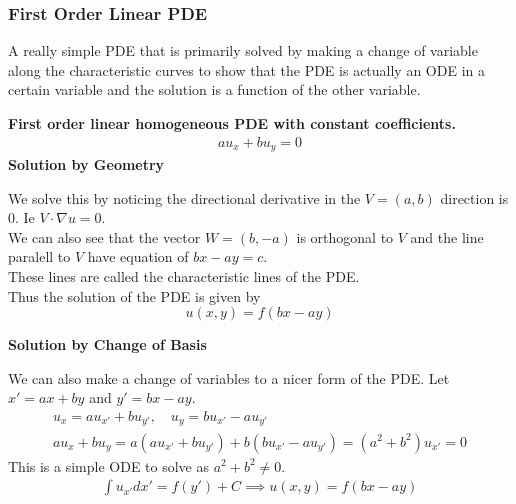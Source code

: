 \documentclass[answers,12pt,addpoints]{exam}
\begin{document}
\subsubsection{First Order Linear PDE}
    A really simple PDE that is primarily solved by making a change of variable along the characteristic curves to show that the PDE is actually an ODE in a certain variable and the solution is a function of the other variable.
    \begin{example}
        \textbf{First order linear homogeneous PDE with constant coefficients.}
        \begin{align*}
            au_x + bu_y = 0
        \end{align*}
        \textbf{Solution by Geometry}
        \begin{solution}
            We solve this by noticing the directional derivative in the $V = (a, b)$ direction is 0. Ie $V \cdot \nabla u = 0$. \\
            We can also see that the vector $W = (b, -a)$ is orthogonal to $V$ and the line paralell to $V$ have equation of $bx - ay = c$.\\
            These lines are called the characteristic lines of the PDE.\\
            Thus the solution of the PDE is given by
            $$ u(x, y) = f(bx - ay) $$
        \end{solution}
        \textbf{Solution by Change of Basis}
        \begin{solution}
            We can also make a change of variables to a nicer form of the PDE. Let $x' = ax + by$ and $y' = bx - ay$. 
            \begin{align*}
                u_x = a u_{x'} + b u_{y'}, \quad u_y = bu_{x'} - au_{y'}\\
                au_x + bu_y = a(au_{x'} + bu_{y'}) + b(bu_{x'} - au_{y'}) = (a^2 + b^2)u_{x'} = 0
            \end{align*}
            This is a simple ODE to solve as $a^2 + b^2 \neq 0$.
            \begin{align*}
                \int u_{x'} dx' = f(y') + C \implies u(x, y) = f(bx - ay)
            \end{align*}
        \end{solution}
    \end{example}
\end{document}
